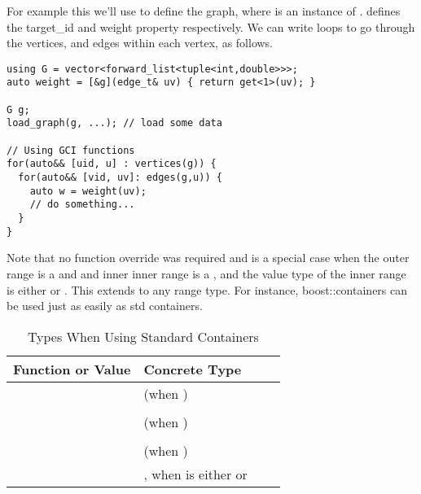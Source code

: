 For example this we'll use  to define the graph, where  
is an instance of .  defines the target\_id and weight property respectively. We
can write loops to go through the vertices, and edges within each vertex, as follows.

\begin{lstlisting}
using G = vector<forward_list<tuple<int,double>>>;
auto weight = [&g](edge_t& uv) { return get<1>(uv); }

G g;
load_graph(g, ...); // load some data

// Using GCI functions
for(auto&& [uid, u] : vertices(g)) {
  for(auto&& [vid, uv]: edges(g,u)) {
    auto w = weight(uv);
    // do something...
  }
}
\end{lstlisting}

Note that no function override was required and is a special case when the outer range is a  and
and inner inner range is a , and the value type of the inner range is either 
 or . This extends to any range type. For instance, boost::containers can be used
 just as easily as std containers. 

\begin{table}[h!]
    \begin{center}
    \resizebox{\textwidth}{!}
    {\begin{tabular}{l l p{1.5cm} L{7.0cm}}
    \hline
        \textbf{Function or Value} & \textbf{Concrete Type} \\
    \hline
         &  (when ) \\
         &  & \\
         &  (when ) \\
         &  & \\
         &  (when ) \\
         & , when  is either   or  \\
    \hline
    \end{tabular}}
    \caption{Types When Using Standard Containers}
    \label{tab:simple_graph}
    \end{center}
\end{table}


